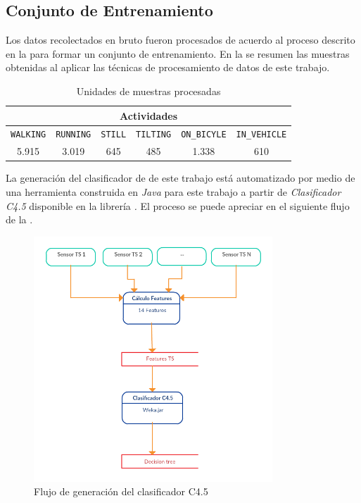 \subsection{Conjunto de Entrenamiento }

\label{ssec6:training}Los datos recolectados en bruto fueron procesados
de acuerdo al proceso descrito en la  para
formar un conjunto de entrenamiento. En la 
se resumen las muestras obtenidas al aplicar las técnicas de procesamiento
de datos de este trabajo. 

\begin{table}[h]
\begin{centering}
\begin{tabular}{|c|c|c|c|c|c|}
\hline 
\multicolumn{6}{|c|}{Actividades}\tabularnewline
\hline 
\texttt{\footnotesize{}WALKING} & \texttt{\footnotesize{}RUNNING} & \texttt{\footnotesize{}STILL} & \texttt{\footnotesize{}TILTING} & \texttt{\footnotesize{}ON\_BICYLE} & \texttt{\footnotesize{}IN\_VEHICLE}\tabularnewline
\hline 
\hline 
5.915 & 3.019 & 645 & 485 & 1.338 & 610\tabularnewline
\hline 
\end{tabular}
\par\end{centering}
\caption{\label{tab6:muestras}Unidades de muestras procesadas}
\end{table}

La generación del clasificador de  de este trabajo está
automatizado por medio de una herramienta construida en \emph{Java
}para este trabajo\emph{ }a partir de \emph{Clasificador C4.5} disponible
en la librería \emph{. }El proceso se puede apreciar en
el siguiente flujo de la .

\begin{figure}[th]
\begin{centering}
\includegraphics[width=0.8\textwidth]{capitulo-6/graphics/proceso-genera-clasi}
\par\end{centering}
\caption{\label{fig6:proceso-clasi}Flujo de generación del clasificador C4.5}
\end{figure}

